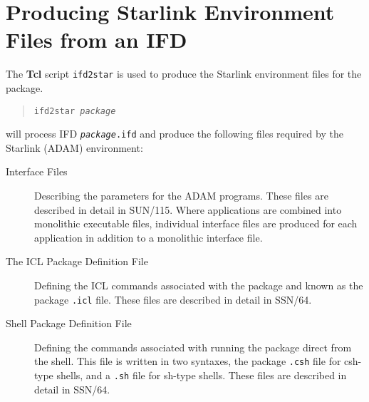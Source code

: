 \documentclass[twoside,11pt]{article}
\newcommand{\xref}[3]{#1}
\newcommand{\xlabel}[1]{}
\begin{document}
\section{\label{ifd2star}\xlabel{producing_starlink_environment_files_from_an_ifd}Producing 
Starlink Environment Files from an IFD}
The \textbf{Tcl} script \texttt{ifd2star} is used to produce the Starlink 
environment files for the package. 
\begin{quote}
\texttt{ifd2star \textit{package}}
\end{quote}
will process IFD \texttt{\textit{package}.ifd} and produce the following files
required by the Starlink (ADAM) environment:
\begin{description}
\item[Interface Files] Describing the parameters for the ADAM programs.
These files are described in detail in
\xref{SUN/115}{sun115}{}.
Where applications are combined into monolithic executable files, individual
interface files are produced for each application in addition to a monolithic 
interface file.
\item[The \xref{ICL}{sg5}{} Package Definition File] Defining the ICL commands 
associated with the package and known as the package \texttt{.icl} file.
These files are described in detail in
\xref{SSN/64}{ssn64}{}.
\item[Shell Package Definition File] Defining the commands associated with 
running the package direct from the shell. This file is written in two
syntaxes, the package \texttt{.csh} file for csh-type shells, and a
\texttt{.sh} file for sh-type shells.
These files are described in detail in
\xref{SSN/64}{ssn64}{}.
\end{description}
\end{document}
